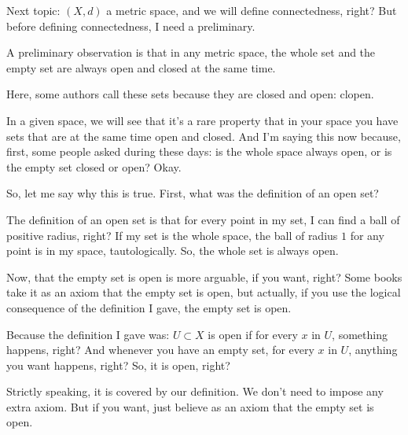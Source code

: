 \begin{speech}[01:12:47 - 01:14:49]
Next topic: $(X, d)$ a metric space, and we will define connectedness, right? But before defining connectedness, I need a preliminary.

A preliminary observation  is that in any metric space,  the whole set and the empty set  are always open and closed at the same time. 

Here, some authors call these sets  because they are closed and open: clopen. 

In a given space, we will see that it's a rare property that in your space you have sets that are at the same time open and closed. And I'm saying this now because, first, some people asked during these days: is the whole space always open, or is the empty set closed or open? Okay.
\end{speech}

\begin{speech}[01:14:49 - 01:16:27]
So, let me say why this is true. First, what was the definition of an open set?

The definition of an open set is that for every point in my set, I can find a ball of positive radius, right? If my set is the whole space, the ball of radius $1$ for any point is in my space, tautologically. So, the whole set is always open.

Now, that the empty set is open is more arguable, if you want, right? Some books take it as an axiom that the empty set is open, but actually, if you use the logical consequence of the definition I gave, the empty set is open.

Because the definition I gave was: $U \subset X$ is open  if for every $x$ in $U$,  something happens, right? And whenever you have an empty set, for every $x$ in $U$, anything you want happens, right? So, it is open, right?

Strictly speaking, it is covered by our definition. We don't need to impose any extra axiom. But if you want, just believe as an axiom that the empty set is open. 
\end{speech}

